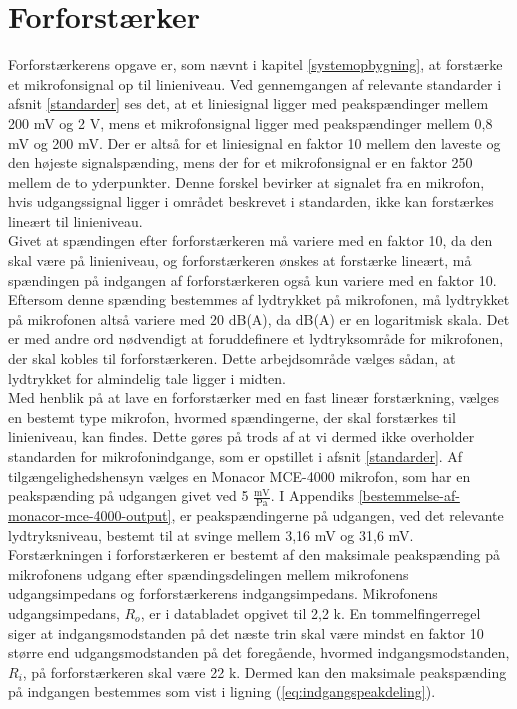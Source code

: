 \chapter{Forforstærker}
\label{forforstaerker}
Forforstærkerens opgave er, som nævnt i kapitel \ref{systemopbygning}, at forstærke et mikrofonsignal op til linieniveau. Ved gennemgangen af relevante standarder i afsnit \ref{standarder} ses det, at et liniesignal ligger med peakspændinger mellem 200 mV og 2 V, mens et mikrofonsignal ligger med peakspændinger mellem 0,8 mV og 200 mV. Der er altså for et liniesignal en faktor 10 mellem den laveste og den højeste signalspænding, mens der for et mikrofonsignal er en faktor 250 mellem de to yderpunkter. Denne forskel bevirker at signalet fra en mikrofon, hvis udgangssignal ligger i området beskrevet i standarden, ikke kan forstærkes lineært til linieniveau.\\ 
Givet at spændingen efter forforstærkeren må variere med en faktor 10, da den skal være på linieniveau, og forforstærkeren ønskes at forstærke lineært, må spændingen på indgangen af forforstærkeren også kun variere med en faktor 10. Eftersom denne spænding bestemmes af lydtrykket på mikrofonen, må lydtrykket på mikrofonen altså variere med 20 dB(A), da dB(A) er en logaritmisk skala. Det er med andre ord nødvendigt at foruddefinere et lydtryksområde for mikrofonen, der skal kobles til forforstærkeren. Dette arbejdsområde vælges sådan, at lydtrykket for almindelig tale ligger i midten. \\
Med henblik på at lave en forforstærker med en fast lineær forstærkning, vælges en bestemt type mikrofon, hvormed spændingerne, der skal forstærkes til linieniveau, kan findes. Dette gøres på trods af at vi dermed ikke overholder standarden for mikrofonindgange, som er opstillet i afsnit \ref{standarder}. Af tilgængelighedshensyn vælges en Monacor MCE-4000 mikrofon, som har en peakspænding på udgangen givet ved 5 $\mathrm{\tfrac{mV}{Pa}}$. I Appendiks \ref{bestemmelse-af-monacor-mce-4000-output}, er peakspændingerne på udgangen, ved det relevante lydtryksniveau, bestemt til at svinge mellem 3,16 mV og 31,6 mV. Forstærkningen i forforstærkeren er bestemt af den maksimale peakspænding på mikrofonens udgang efter spændingsdelingen mellem mikrofonens udgangsimpedans og forforstærkerens indgangsimpedans. Mikrofonens udgangsimpedans, $R_o$, er i databladet \cite{mic-datablad} opgivet til 2,2 k\ohm. En tommelfingerregel siger at indgangsmodstanden på det næste trin skal være mindst en faktor 10 større end udgangsmodstanden på det foregående, hvormed indgangsmodstanden, $R_i$, på forforstærkeren skal være 22 k\ohm. Dermed kan den maksimale peakspænding på indgangen bestemmes som vist i ligning (\ref{eq:indgangspeakdeling}).

